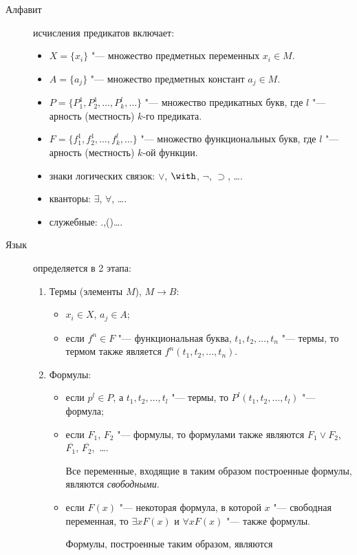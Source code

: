 \begin{description}
  \item[Алфавит] исчисления предикатов включает:
    \begin{itemize}
    \item $X = \{x_i\}$ "--- множество предметных переменных $x_i \in
M$.
    \item $A = \{a_j\}$ "--- множество предметных констант $a_j \in M$.
    \item $P = \{P_1^1,P_2^1,\ldots,P_k^l,\ldots\}$ "--- множество
предикатных букв, где $l$ "--- арность (местность) $k$-го предиката.
    \item $F = \{f_1^1,f_2^1,\ldots,f_k^l,\ldots\}$ "--- множество
функциональных букв, где $l$ "--- арность (местность) $k$-ой функции.
    \item знаки логических связок: $\lor$, $\with$, $\lnot$,
$\supset$, \ldots.
    \item кванторы: $\exists$, $\forall$, \ldots.
    \item служебные: .\quad,\quad(\quad)\quad \ldots.
    \end{itemize}
  \item[Язык] определяется в 2 этапа:
    \begin{enumerate}
    \item Термы (элементы $M$), $M \rightarrow B$:
      \begin{itemize}
      \item $x_i \in X$, $a_j \in A$;
      \item если $f^n \in F$ "--- функциональная буква,
$t_1,t_2,\ldots,t_n$ "--- термы, то термом также является
$f^n(t_1,t_2,\ldots,t_n)$.
      \end{itemize}
    \item Формулы:
      \begin{itemize}
      \item если $p^l \in P$, а $t_1,t_2,\ldots,t_l$ "--- термы, то
$P^l(t_1,t_2,\ldots,t_l)$ "--- формула;
      \item если $F_1$, $F_2$ "--- формулы, то формулами также являются
$F_1 \lor F_2$, $\overline{F_1}$, $\overline{F_2}$,~\ldots.
        \begin{rem} Все переменные, входящие в таким образом
построенные формулы, являются \emph{свободными}.
        \end{rem}
      \item если $F(x)$ "--- некоторая формула, в которой $x$ "---
свободная переменная, то $\exists x F(x)$ и $\forall x F(x)$ "--- также
формулы.
        \begin{rem} Формулы, построенные таким образом, являются

\end{rem}
\end{itemize}
\end{enumerate}
\end{description}
